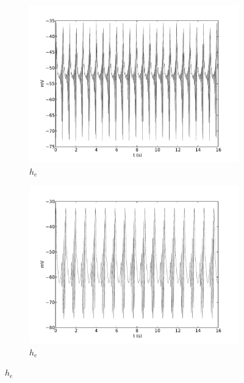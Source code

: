 \documentclass[a4paper,12pt]{article}
\begin{document}
\begin{figure}
\begin{subfigure}[b]{0.5\textwidth}
		\includegraphics[scale=0.35]{frontiers-2012-images-revised/effect_gamma_ee_yml-00493_ode-burst-psp-res_yml-mod-res-0_9-1-1-1_yml-he-intra.pdf}
		\caption{$h_e$}
	\end{subfigure}
	\begin{subfigure}[b]{0.5\textwidth}
		\includegraphics[scale=0.35]{frontiers-2012-images-revised/effect_gamma_ee_yml-00493_ode-burst-psp-res_yml-mod-res-0_5-1-1-1_yml-he-intra.pdf}
		\caption{$h_e$}
	\end{subfigure}


\end{figure}
\end{document}
